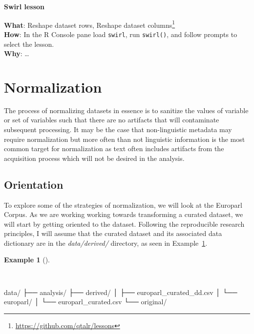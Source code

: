 \documentclass[
  letterpaper,
  DIV=11,
  numbers=noendperiod]{scrreport}
\newenvironment{Shaded}{\begin{snugshade}}{\end{snugshade}}
\newcommand{\ExtensionTok}[1]{\textcolor[rgb]{0.00,0.00,0.00}{#1}}
\newcommand{\NormalTok}[1]{\textcolor[rgb]{0.00,0.00,0.00}{#1}}
\theoremstyle{definition}
\newtheorem{example}{Example}[chapter]
\theoremstyle{remark}
\DeclareRobustCommand{\href}[2]{#2\footnote{\url{#1}}}
\begin{document}
\begin{tcolorbox}[enhanced jigsaw, breakable, colback=white, rightrule=.15mm, arc=.35mm, left=2mm, toprule=.15mm, leftrule=.75mm, bottomrule=.15mm, opacityback=0]

\textbf{ Swirl lesson}

\textbf{What}: \href{https://github.com/qtalr/lessons}{Reshape dataset
rows, Reshape dataset columns}\\
\textbf{How}: In the R Console pane load \texttt{swirl}, run
\texttt{swirl()}, and follow prompts to select the lesson.\\
\textbf{Why}: \ldots{}

\end{tcolorbox}

\hypertarget{sec-td-normalization}{%
\section{Normalization}\label{sec-td-normalization}}

The process of normalizing datasets in essence is to sanitize the values
of variable or set of variables such that there are no artifacts that
will contaminate subsequent processing. It may be the case that
non-linguistic metadata may require normalization but more often than
not linguistic information is the most common target for normalization
as text often includes artifacts from the acquisition process which will
not be desired in the analysis.

\hypertarget{sec-td-normalization-orientation}{%
\subsection{Orientation}\label{sec-td-normalization-orientation}}

To explore some of the strategies of normalization, we will look at the
Europarl Corpus. As we are working working towards transforming a
curated dataset, we will start by getting oriented to the dataset.
Following the reproducible research principles, I will assume that the
curated dataset and its associated data dictionary are in the
\emph{data/derived/} directory, as seen in
Example~\ref{exm-td-europarl-curated-structure}.

\begin{example}[]\protect\hypertarget{exm-td-europarl-curated-structure}{}\label{exm-td-europarl-curated-structure}

~

\begin{Shaded}
\begin{Highlighting}[]
\ExtensionTok{data/}
\ExtensionTok{├──}\NormalTok{ analysis/}
\ExtensionTok{├──}\NormalTok{ derived/}
\ExtensionTok{│}\NormalTok{   ├── europarl\_curated\_dd.csv}
\ExtensionTok{│}\NormalTok{   └── europarl/}
\ExtensionTok{│}\NormalTok{       └── europarl\_curated.csv}
\ExtensionTok{└──}\NormalTok{ original/}
\end{Highlighting}
\end{Shaded}

\end{example}
\end{document}

